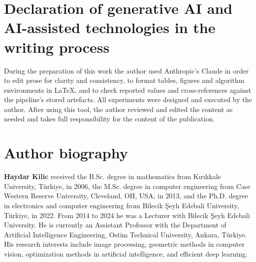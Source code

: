 \documentclass[final,5p,times,twocolumn]{elsarticle}
\theoremstyle{remark}
\begin{document}
\section*{Declaration of generative AI and AI-assisted technologies in the
writing process}
During the preparation of this work the author used Anthropic's Claude in
order to edit prose for clarity and consistency, to format tables, figures and
algorithm environments in \LaTeX{}, and to check reported values and
cross-references against the pipeline's stored artefacts. All experiments were
designed and executed by the author. After using this tool, the author
reviewed and edited the content as needed and takes full responsibility for the
content of the publication.



\section*{Author biography}

\noindent
\textbf{Haydar Kilic} received the B.Sc. degree in mathematics from
K\i r\i kkale University, T\"urkiye, in 2006, the M.Sc. degree in computer
engineering from Case Western Reserve University, Cleveland, OH, USA, in 2013,
and the Ph.D. degree in electronics and computer engineering from Bilecik
\c{S}eyh Edebali University, T\"urkiye, in 2022. From 2014 to 2024 he was a
Lecturer with Bilecik \c{S}eyh Edebali University. He is currently an Assistant
Professor with the Department of Artificial Intelligence Engineering, Ostim
Technical University, Ankara, T\"urkiye. His research interests include image
processing, geometric methods in computer vision, optimization methods in
artificial intelligence, and efficient deep learning.
\end{document}
